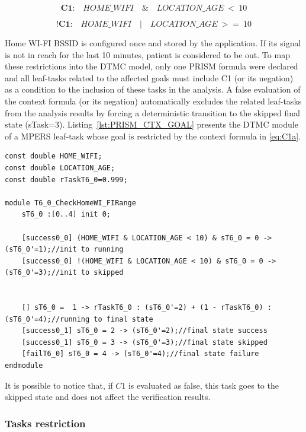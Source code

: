 \begin{equation}\label{eq:C1a}
\textbf{C1:}\quad HOME\_WIFI\quad \&\quad LOCATION\_AGE\ <\ 10
\end{equation}

\begin{equation}\label{eq:C1b}
\textbf{!C1:}\quad HOME\_WIFI\quad |\quad LOCATION\_AGE\ >=\ 10
\end{equation}

Home WI-FI BSSID is configured once and stored by the application. If its signal is not in reach for the last 10 minutes, patient is considered to be out. To map these restrictions into the DTMC model, only one PRISM formula were declared and all leaf-tasks related to the affected goals must include C1 (or its negation) as a condition to the inclusion of these tasks in the analysis. A false evaluation of the context formula (or its negation) automatically excludes the related leaf-tasks from the analysis results by forcing a deterministic transition to the skipped final state (sTask=3). Listing~\ref{lst:PRISM_CTX_GOAL} presents the DTMC module of a MPERS leaf-task whose goal is restricted by the context formula in \eqref{eq:C1a}.
\medskip

\begin{lstlisting}[language=Prism, caption={Variable declaration and module representing a leaf-task from a restricted goal.},label={lst:PRISM_CTX_GOAL}]
const double HOME_WIFI;
const double LOCATION_AGE;
const double rTaskT6_0=0.999;

module T6_0_CheckHomeWI_FIRange
	sT6_0 :[0..4] init 0;
	
	[success0_0] (HOME_WIFI & LOCATION_AGE < 10) & sT6_0 = 0 -> (sT6_0'=1);//init to running
	[success0_0] !(HOME_WIFI & LOCATION_AGE < 10) & sT6_0 = 0 -> (sT6_0'=3);//init to skipped


	[] sT6_0 =  1 -> rTaskT6_0 : (sT6_0'=2) + (1 - rTaskT6_0) : (sT6_0'=4);//running to final state
	[success0_1] sT6_0 = 2 -> (sT6_0'=2);//final state success
	[success0_1] sT6_0 = 3 -> (sT6_0'=3);//final state skipped
	[failT6_0] sT6_0 = 4 -> (sT6_0'=4);//final state failure
endmodule
\end{lstlisting}

It is possible to notice that, if $C1$ is evaluated as false, this task goes to the skipped state and does not affect the verification results.

\subsubsection{Tasks restriction}

